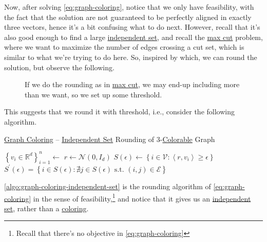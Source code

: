 Now, after solving \autoref{eq:graph-coloring}, notice that we only have feasibility, with the fact that the solution are not guaranteed to be perfectly aligned in exactly three vectors, hence it's a bit confusing what to do next. However, recall that it's also good enough to find a large \hyperref[def:independent-set]{independent set}, and recall the \hyperref[prb:max-cut]{max cut} problem, where we want to maximize the number of edges crossing a cut set, which is similar to what we're trying to do here. So, inspired by which, we can round the solution, but observe the following.

\begin{figure}[H]
	\centering
	\caption{If we do the rounding as in \hyperref[prb:max-cut]{max cut}, we may end-up including more than we want, so we set up some threshold.}
	\label{fig:3-coloring-threshold}
\end{figure}

This suggests that we round it with threshold, i.e., consider the following algorithm.

\begin{algorithm}[H]\label{algo:graph-coloring-independent-set}
	\DontPrintSemicolon
	\caption{\hyperref[prb:graph-coloring]{Graph Coloring} -- \hyperref[def:independent-set]{Independent Set} Rounding of \(3\)-\hyperref[def:coloring]{Colorable} Graph}
	\BlankLine
	\(\left\{ v_i \in \mathbb{R} ^d\right\} _{i=1}^n \gets\)\;
	\(r \gets \mathcal{N} (0, I_d)\)\label{algo:graph-coloring-independent-set-r}
	\(S(\epsilon )\gets\left\{ i\in \mathcal{V} \colon \left\langle r, v_i \right\rangle \geq \epsilon   \right\} \)
	\(S^\prime (\epsilon )= \left\{ i\in S(\epsilon )\colon \nexists j\in S(\epsilon ) \text{ s.t. } (i, j)\in \mathcal{E} \right\} \)
	\;
\end{algorithm}

\begin{remark}
	\autoref{algo:graph-coloring-independent-set} is the rounding algorithm of \autoref{eq:graph-coloring} in the sense of feasibility,\footnote{Recall that there's no objective in \autoref{eq:graph-coloring}} and notice that it gives us an \hyperref[def:independent-set]{independent set}, rather than a \hyperref[def:coloring]{coloring}.
\end{remark}